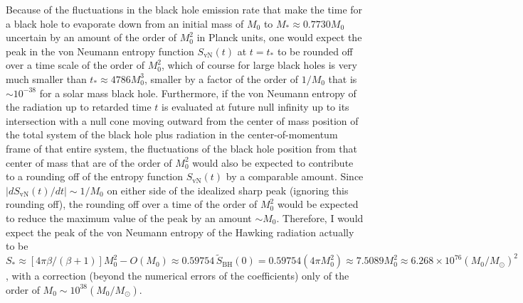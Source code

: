 \documentclass[12pt]{article}
\begin{document}
Because of the fluctuations in the black hole emission rate that make the time for a black hole to evaporate down from an initial mass of $M_0$ to $M_\ast \approx 0.7730 M_0$ uncertain by an amount of the order of $M_0^2$ in Planck units, one would expect the peak in the von Neumann entropy function $S_\mathrm{vN}(t)$ at $t = t_\ast$ to be rounded off over a time scale of the order of $M_0^2$, which of course for large black holes is very much smaller than $t_\ast \approx 4786 M_0^3$, smaller by a factor of the order of $1/M_0$ that is $\sim 10^{-38}$ for a solar mass black hole.  Furthermore, if the von Neumann entropy of the radiation up to retarded time $t$ is evaluated at future null infinity up to its intersection with a null cone moving outward from the center of mass position of the total system of the black hole plus radiation in the center-of-momentum frame of that entire system, the fluctuations of the black hole position from that center of mass that are of the order of $M_0^2$ \cite{Page:1979tc,Nomura:2012cx,Nomura:2012ex} would also be expected to contribute to a rounding off of the entropy function $S_\mathrm{vN}(t)$ by a comparable amount.  Since $|dS_\mathrm{vN}(t)/dt| \sim 1/M_0$ on either side of the idealized sharp peak (ignoring this rounding off), the rounding off over a time of the order of $M_0^2$ would be expected to reduce the maximum value of the peak by an amount $\sim M_0$.  Therefore, I would expect the peak of the von Neumann entropy of the Hawking radiation actually to be $S_\ast \approx [4\pi\beta/(\beta+1)]M_0^2 - O(M_0) \approx 0.59754 \,\tilde{S}_\mathrm{BH}(0) = 0.59754(4\pi M_0^2) \approx 7.5089 M_0^2 \approx 6.268\times 10^{76} (M_0/M_\odot)^2$, with a correction (beyond the numerical errors of the coefficients) only of the order of $M_0 \sim 10^{38}(M_0/M_\odot)$.
\end{document}
